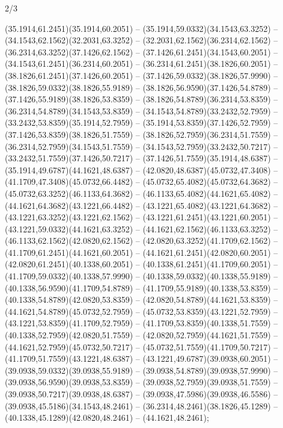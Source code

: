 \begin{flagdescription}{2/3}
\begin{scope}[xshift=0.3333\flaglength,yshift=0.5\flagwidth,scale=\flagwidth/711.3]
\begin{scope}
    (35.1914,61.2451)(35.1914,60.2051) -- (35.1914,59.0332)(34.1543,63.3252) --
    (34.1543,62.1562)(32.2031,63.3252) -- (32.2031,62.1562)(36.2314,62.1562) --
    (36.2314,63.3252)(37.1426,62.1562) -- (37.1426,61.2451)(34.1543,60.2051) --
    (34.1543,61.2451)(36.2314,60.2051) -- (36.2314,61.2451)(38.1826,60.2051) --
    (38.1826,61.2451)(37.1426,60.2051) -- (37.1426,59.0332)(38.1826,57.9990) --
    (38.1826,59.0332)(38.1826,55.9189) -- (38.1826,56.9590)(37.1426,54.8789) --
    (37.1426,55.9189)(38.1826,53.8359) -- (38.1826,54.8789)(36.2314,53.8359) --
    (36.2314,54.8789)(34.1543,53.8359) -- (34.1543,54.8789)(33.2432,52.7959) --
    (33.2432,53.8359)(35.1914,52.7959) -- (35.1914,53.8359)(37.1426,52.7959) --
    (37.1426,53.8359)(38.1826,51.7559) -- (38.1826,52.7959)(36.2314,51.7559) --
    (36.2314,52.7959)(34.1543,51.7559) -- (34.1543,52.7959)(33.2432,50.7217) --
    (33.2432,51.7559)(37.1426,50.7217) -- (37.1426,51.7559)(35.1914,48.6387) --
    (35.1914,49.6787)(44.1621,48.6387) -- (42.0820,48.6387)(45.0732,47.3408) --
    (41.1709,47.3408)(45.0732,66.4482) -- (45.0732,65.4082)(45.0732,64.3682) --
    (45.0732,63.3252)(46.1133,64.3682) -- (46.1133,65.4082)(44.1621,65.4082) --
    (44.1621,64.3682)(43.1221,66.4482) -- (43.1221,65.4082)(43.1221,64.3682) --
    (43.1221,63.3252)(43.1221,62.1562) -- (43.1221,61.2451)(43.1221,60.2051) --
    (43.1221,59.0332)(44.1621,63.3252) -- (44.1621,62.1562)(46.1133,63.3252) --
    (46.1133,62.1562)(42.0820,62.1562) -- (42.0820,63.3252)(41.1709,62.1562) --
    (41.1709,61.2451)(44.1621,60.2051) -- (44.1621,61.2451)(42.0820,60.2051) --
    (42.0820,61.2451)(40.1338,60.2051) -- (40.1338,61.2451)(41.1709,60.2051) --
    (41.1709,59.0332)(40.1338,57.9990) -- (40.1338,59.0332)(40.1338,55.9189) --
    (40.1338,56.9590)(41.1709,54.8789) -- (41.1709,55.9189)(40.1338,53.8359) --
    (40.1338,54.8789)(42.0820,53.8359) -- (42.0820,54.8789)(44.1621,53.8359) --
    (44.1621,54.8789)(45.0732,52.7959) -- (45.0732,53.8359)(43.1221,52.7959) --
    (43.1221,53.8359)(41.1709,52.7959) -- (41.1709,53.8359)(40.1338,51.7559) --
    (40.1338,52.7959)(42.0820,51.7559) -- (42.0820,52.7959)(44.1621,51.7559) --
    (44.1621,52.7959)(45.0732,50.7217) -- (45.0732,51.7559)(41.1709,50.7217) --
    (41.1709,51.7559)(43.1221,48.6387) -- (43.1221,49.6787)(39.0938,60.2051) --
    (39.0938,59.0332)(39.0938,55.9189) -- (39.0938,54.8789)(39.0938,57.9990) --
    (39.0938,56.9590)(39.0938,53.8359) -- (39.0938,52.7959)(39.0938,51.7559) --
    (39.0938,50.7217)(39.0938,48.6387) -- (39.0938,47.5986)(39.0938,46.5586) --
    (39.0938,45.5186)(34.1543,48.2461) -- (36.2314,48.2461)(38.1826,45.1289) --
    (40.1338,45.1289)(42.0820,48.2461) -- (44.1621,48.2461);


\end{scope}
\end{scope}
\end{flagdescription}
